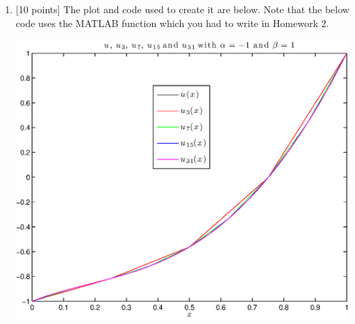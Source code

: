 \begin{solution}
\begin{enumerate}
\item {[10 points]} The plot and code used to create it are below. Note that the below code uses the MATLAB function which you had to write in Homework 2.

\begin{center}
\includegraphics[scale=0.7]{hw36c.eps}
\end{center}



\end{enumerate}
\end{solution}
